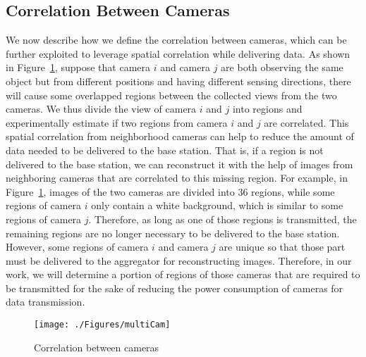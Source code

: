 \subsection{Correlation Between Cameras}
We now describe how we define the correlation between cameras, which can be further
exploited to leverage spatial correlation while delivering data.
As shown in Figure~\ref{fig::multiCam}, suppose that camera $i$ and camera $j$ are
both observing the same object but from different positions and having different
sensing directions, there will cause some overlapped regions between the collected
views from the two cameras.
We thus divide the view of camera $i$ and $j$ into regions and experimentally
estimate if two regions from camera $i$ and $j$ are correlated.
This spatial correlation from neighborhood cameras can help to reduce the amount of
data needed to be delivered to the base station.
That is, if a region is not delivered to the base station, we can reconstruct it with the help
of images from neighboring cameras that are correlated to this missing region.
%
For example, in Figure~\ref{fig::multiCam}, images of the two cameras are divided into
$36$ regions, while some regions of camera $i$ only contain a white background, which
is similar to some regions of camera $j$.
Therefore, as long as one of those regions is transmitted, the remaining regions are no
longer necessary to be delivered to the base station.
However, some regions of camera $i$ and camera $j$ are unique so that those part must
be delivered to the aggregator for reconstructing images.
Therefore, in our work, we will determine a portion of regions of those cameras that are
required to be transmitted for the sake of reducing the power consumption of cameras
for data transmission.
\begin{figure}
\begin{center}
\texttt{[image: ./Figures/multiCam]}
\caption{\label{fig::multiCam}Correlation between cameras}
\end{center}
\end{figure}